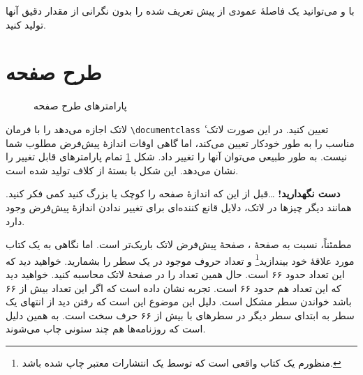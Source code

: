 با  و  می‌توانید یک فاصلهٔ عمودی از پیش‌ تعریف شده را بدون نگرانی از مقدار دقیق آنها تولید کنید.

\section{طرح صفحه}
\begin{figure}[!hp]
\begin{center}
\begin{latin}
\makeatletter\@mylayout\makeatother
\end{latin}
\end{center}
\vspace*{1.8cm}
\caption{پارامتر‌های طرح صفحه}
\label{fig:layout}
\end{figure}

لاتک اجازه می‌دهد 
را با فرمان \verb|\documentclass| تعیین کنید. در این صورت لاتک 
ٔ
 مناسب را به طور خودکار تعیین می‌کند، اما گاهی اوقات اندازهٔ پیش‌فرض مطلوب شما نیست. به طور طبیعی می‌توان آنها را تغییر داد.
\thispagestyle{fancyplain}
شکل 
\ref{fig:layout} 
تمام پارامترهای قابل تغییر را نشان می‌دهد. این شکل با بستهٔ   از کلاف  تولید شده است.%

\textbf{دست نگهدارید!} \ldots قبل از این که اندازهٔ صفحه را کوچک یا بزرگ کنید کمی فکر کنید. همانند دیگر چیزها در لاتک، دلایل قانع کننده‌ای برای تغییر ندادن اندازهٔ پیش‌فرض وجود دارد.

مطمئناً، نسبت به صفحهٔ ، صفحهٔ پیش‌فرض لاتک باریک‌تر است. اما نگاهی به یک کتاب مورد علاقهٔ خود بیندازید\footnote{منظورم یک کتاب واقعی است که توسط یک انتشارات معتبر چاپ شده باشد.}
و تعداد حروف موجود در یک سطر را بشمارید. خواهید دید که این تعداد حدود ۶۶ است. حال همین تعداد را در صفحهٔ لاتک محاسبه کنید.  خواهید دید که این تعداد هم حدود ۶۶ است. تجربه نشان داده است که اگر این تعداد بیش از ۶۶ باشد خواندن سطر مشکل است. دلیل این موضوع این است که رفتن دید از انتهای یک سطر به ابتدای سطر دیگر در سطرهای با بیش از ۶۶ حرف سخت است. به  همین دلیل است که روزنامه‌ها هم چند ستونی چاپ می‌شوند.

